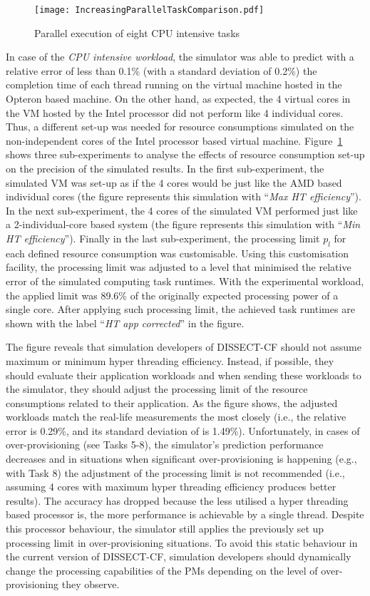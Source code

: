 \documentclass[sort, compress, 5p]{elsarticle}
\begin{document}
\begin{figure}[tb]
\center
\texttt{[image: IncreasingParallelTaskComparison.pdf]}
\caption{Parallel execution of eight CPU intensive tasks\label{FIG-IncParTask}}
\end{figure}

In case of the \emph{CPU intensive workload}, the simulator was able to predict with a relative error of less than 0.1\% (with a standard deviation of 0.2\%) the completion time of each thread running on the virtual machine hosted in the Opteron based machine. On the other hand, as expected, the 4 virtual cores in the VM hosted by the Intel processor did not perform like 4 individual cores. Thus, a different set-up was needed for resource consumptions simulated on the non-independent cores of the Intel processor based virtual machine. Figure~\ref{FIG-IncParTask} shows three sub-experiments to analyse the effects of resource consumption set-up on the precision of the simulated results. In the first sub-experiment, the simulated VM was set-up as if the 4 cores would be just like the AMD based individual cores (the figure represents this simulation with ``\emph{Max HT efficiency}''). In the next sub-experiment, the 4 cores of the simulated VM performed just like a 2-individual-core based system (the figure represents this simulation with ``\emph{Min HT efficiency}''). Finally in the last sub-experiment, the processing limit $p_l$ for each defined resource consumption was customisable. Using this customisation facility, the processing limit was adjusted to a level that minimised the relative error of the simulated computing task runtimes. With the experimental workload, the applied limit was 89.6\% of the originally expected processing power of a single core. After applying such processing limit, the achieved task runtimes are shown with the label ``\emph{HT app corrected}'' in the figure.

The figure reveals that simulation developers of DISSECT-CF should not assume maximum or minimum hyper threading efficiency. Instead, if possible, they should evaluate their application workloads and when sending these workloads to the simulator, they should adjust the processing limit of the resource consumptions related to their application. As the figure shows, the adjusted workloads match the real-life measurements the most closely (i.e., the relative error is 0.29\%, and its standard deviation of is 1.49\%). Unfortunately, in cases of over-provisioning (see Tasks 5-8), the simulator's prediction performance decreases and in situations when significant over-provisioning is happening (e.g., with Task 8) the adjustment of the processing limit is not recommended (i.e., assuming 4 cores with maximum hyper threading efficiency produces better results). The accuracy has dropped because the less utilised a hyper threading based processor is, the more performance is achievable by a single thread. Despite this processor behaviour, the simulator still applies the previously set up processing limit in over-provisioning situations. To avoid this static behaviour in the current version of DISSECT-CF, simulation developers should dynamically change the processing capabilities of the PMs depending on the level of over-provisioning they observe.
\end{document}

